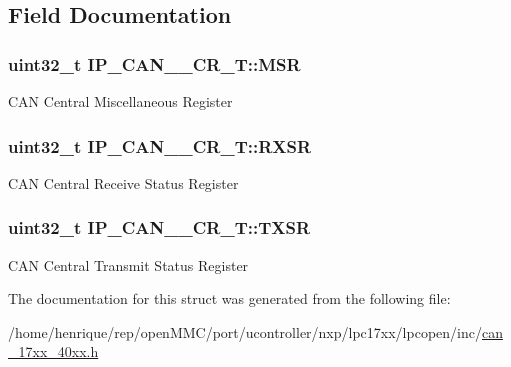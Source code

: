 \subsection{Field Documentation}
\hypertarget{structIP__CAN__001__CR__T_a4cfec80b7875ddddf16f1b7284280423}{
\subsubsection[{M\-S\-R}]{ uint32\-\_\-t I\-P\-\_\-\-C\-A\-N\-\_\-\_\-\-C\-R\-\_\-\-T\-::\-M\-S\-R}}\label{structIP__CAN__001__CR__T_a4cfec80b7875ddddf16f1b7284280423}
C\-A\-N Central Miscellaneous Register \hypertarget{structIP__CAN__001__CR__T_a421bed687294a71ec89ece1ea01fc808}{
\subsubsection[{R\-X\-S\-R}]{ uint32\-\_\-t I\-P\-\_\-\-C\-A\-N\-\_\-\_\-\-C\-R\-\_\-\-T\-::\-R\-X\-S\-R}}\label{structIP__CAN__001__CR__T_a421bed687294a71ec89ece1ea01fc808}
C\-A\-N Central Receive Status Register \hypertarget{structIP__CAN__001__CR__T_a7ce56eda4c7eabebb9597b8b9cd418ac}{
\subsubsection[{T\-X\-S\-R}]{ uint32\-\_\-t I\-P\-\_\-\-C\-A\-N\-\_\-\_\-\-C\-R\-\_\-\-T\-::\-T\-X\-S\-R}}\label{structIP__CAN__001__CR__T_a7ce56eda4c7eabebb9597b8b9cd418ac}
C\-A\-N Central Transmit Status Register 

The documentation for this struct was generated from the following file\-:\begin{DoxyCompactItemize}
\item 
/home/henrique/rep/open\-M\-M\-C/port/ucontroller/nxp/lpc17xx/lpcopen/inc/\hyperlink{can__17xx__40xx_8h}{can\-\_\-17xx\-\_\-40xx.\-h}\end{DoxyCompactItemize}
